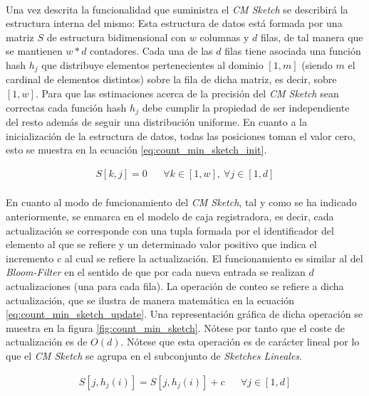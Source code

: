 \documentclass{subfiles}
\begin{document}
      \paragraph{}
      Una vez descrita la funcionalidad que suministra el \emph{CM Sketch} se describirá la estructura interna del mismo: Esta estructura de datos está formada por una matriz $S$ de estructura bidimensional con $w$ columnas y $d$ filas, de tal manera que se mantienen $w * d$ contadores. Cada una de las $d$ filas tiene asociada una función hash $h_j$ que distribuye elementos pertenecientes al dominio $[1, m]$ (siendo $m$ el cardinal de elementos distintos) sobre la fila de dicha matriz, es decir, sobre $[1,w]$. Para que las estimaciones acerca de la precisión del \emph{CM Sketch} sean correctas cada función hash $h_j$ debe cumplir la propiedad de ser independiente del resto además de seguir una distribución uniforme. En cuanto a la inicialización de la estructura de datos, todas las posiciones toman el valor cero, esto se muestra en la ecuación \eqref{eq:count_min_sketch_init}.

      \begin{align}
      \label{eq:count_min_sketch_init}
        S[k,j] = 0 && \forall k \in [1,w], \ \forall j \in [1,d]
      \end{align}


      \paragraph{}
      En cuanto al modo de funcionamiento del \emph{CM Sketch}, tal y como se ha indicado anteriormente, se enmarca en el modelo de caja registradora, es decir, cada actualización se corresponde con una tupla formada por el identificador del elemento al que se refiere y un determinado valor positivo que indica el incremento $c$ al cual se refiere la actualización. El funcionamiento es similar al del \emph{Bloom-Filter} en el sentido de que por cada nueva entrada se realizan $d$ actualizaciones (una para cada fila). La operación de conteo se refiere a dicha actualización, que se ilustra de manera matemática en la ecuación \eqref{eq:count_min_sketch_update}. Una representación gráfica de dicha operación se muestra en la figura \ref{fig:count_min_sketch}. Nótese por tanto que el coste de actualización es de $O(d)$. Nótese que esta operación es de carácter lineal por lo que el \emph{CM Sketch} se agrupa en el subconjunto de \emph{Sketches Lineales}.

      \begin{align}
      \label{eq:count_min_sketch_update}
        S[j, h_j(i)] = S[j, h_j(i)] + c && \forall j \in [1,d]
      \end{align}
\end{document}
